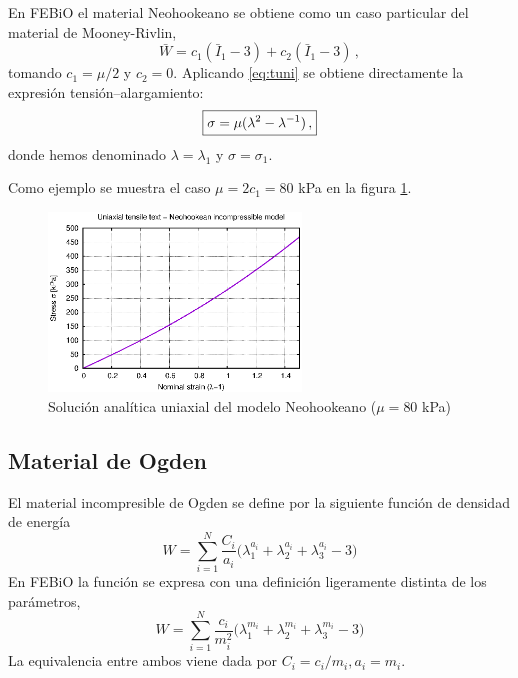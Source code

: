 En FEBiO \cite{febio-tmanual} el material Neohookeano se obtiene como un caso particular del material de Mooney-Rivlin,
\begin{equation}
	\bar W = c_{1} (\bar I_{1}-3) + c_{2} (\bar I_{1}-3)
	\,,
\end{equation}
tomando $c_{1}=\mu/2$ y $c_{2}=0$.
Aplicando \eqref{eq:tuni} se obtiene directamente la expresión tensión--alargamiento:
\begin{equation}
	\fbox{$\displaystyle 
  \sigma = \mu(\lambda^2-\lambda^{-1})
  \,,
  $}
  \label{eq:neoh-tuniax}
\end{equation}
donde hemos denominado 
$\lambda=\lambda_1$ 
y 
$\sigma=\sigma_1$.

Como ejemplo se muestra el caso $\mu=2 c_{1}=80$ kPa en la figura \ref{fig:neoh-anal}.
\begin{figure}[!htp]
\centering
\includegraphics[width=0.6\textwidth]{figuras_3/neoh-anal.eps}
\caption{Solución analítica uniaxial del modelo Neohookeano ($\mu=80$ kPa)}
\label{fig:neoh-anal}
\end{figure}

\subsection{Material de Ogden}
\label{sec:ogden}

El material incompresible de Ogden se define por la siguiente función de densidad de energía
\begin{equation}
	W = \sum_{i=1}^{N} \frac{C_{i}}{a_{i}}
	\big(\lambda_{1}^{a_{i}}+\lambda_{2}^{a_{i}}+\lambda_{3}^{a_{i}}-3\big)
	\label{eq:ogd}
\end{equation}
En FEBiO \cite{febio-tmanual} la función se expresa con una definición ligeramente distinta de los parámetros,
\begin{equation}
	W = \sum_{i=1}^{N} \frac{c_{i}}{m_{i}^{2}}
	\big(\lambda_{1}^{m_{i}}+\lambda_{2}^{m_{i}}+\lambda_{3}^{m_{i}}-3\big)
	\label{eq:ogd-feb}
\end{equation}
La equivalencia entre ambos viene dada por
$C_{i}=c_{i}/m_{i}, a_{i}=m_{i}$.


